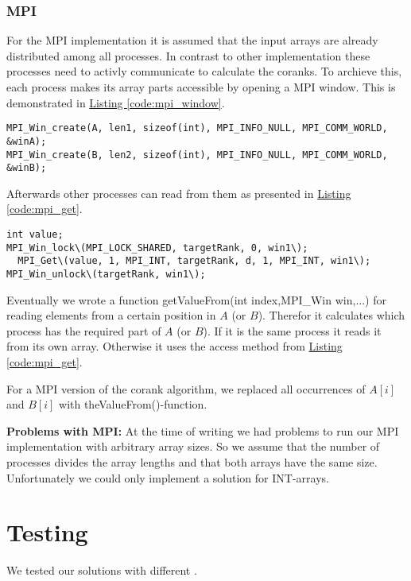 \subsubsection{MPI}
For the MPI implementation it is assumed that the input arrays are already distributed among all processes.
In contrast to other implementation these processes need to activly communicate to calculate the coranks.
To archieve this, each process makes its array parts accessible by opening a MPI window.
This is demonstrated in \hyperref[code:mpi_window]{Listing \ref*{code:mpi_window}}.

\begin{lstlisting}[caption=window to share arrays, label=code:mpi_window,style=c]
MPI_Win_create(A, len1, sizeof(int), MPI_INFO_NULL, MPI_COMM_WORLD, &winA);
MPI_Win_create(B, len2, sizeof(int), MPI_INFO_NULL, MPI_COMM_WORLD, &winB);
\end{lstlisting}

Afterwards other processes can read from them as presented in \hyperref[code:mpi_get]{Listing \ref*{code:mpi_get}}.

\begin{lstlisting}[caption=window to share arrays, label=code:mpi_get,style=c]
int value;
MPI_Win_lock\(MPI_LOCK_SHARED, targetRank, 0, win1\);
  MPI_Get\(value, 1, MPI_INT, targetRank, d, 1, MPI_INT, win1\);
MPI_Win_unlock\(targetRank, win1\);
\end{lstlisting}

Eventually we wrote a function getValueFrom(int index,MPI\_Win win,...) for reading elements from a certain position in $A$ (or $B$).
Therefor it calculates which process has the required part of $A$ (or $B$).
If it is the same process it reads it from its own array.
Otherwise it uses the access method from \hyperref[code:mpi_get]{Listing \ref*{code:mpi_get}}.

For a MPI version of the corank algorithm, we replaced all occurrences of $A[i]$ and $B[i]$ with theValueFrom()-function.


\textbf{Problems with MPI:}
At the time of writing we had problems to run our MPI implementation with arbitrary array sizes.
So we assume that the number of processes divides the array lengths and that both arrays have the same size.
Unfortunately we could only implement a solution for INT-arrays.

\section{Testing}
We tested our solutions with different .


